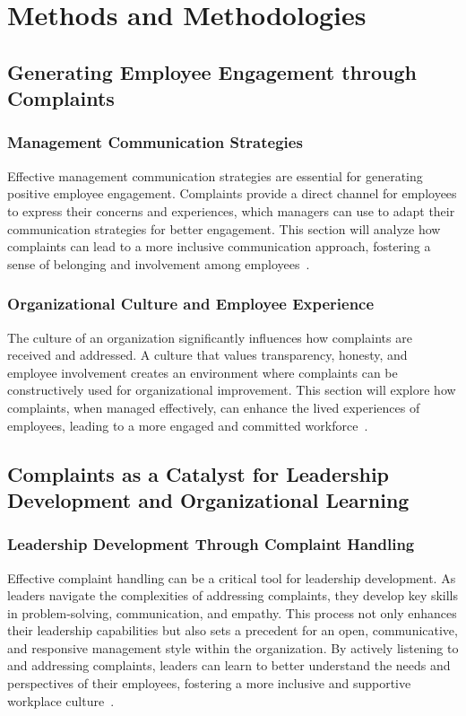 \documentclass[runningheads]{llncs}
\begin{document}
\newpage
\section{Methods and Methodologies}
\subsection{Generating Employee Engagement through Complaints}
\subsubsection{Management Communication Strategies}
Effective management communication strategies are essential for generating positive employee engagement. Complaints provide a direct channel for employees to express their concerns and experiences, which managers can use to adapt their communication strategies for better engagement. This section will analyze how complaints can lead to a more inclusive communication approach, fostering a sense of belonging and involvement among employees~\cite{reissner2013generating}.

\subsubsection{Organizational Culture and Employee Experience}
The culture of an organization significantly influences how complaints are received and addressed. A culture that values transparency, honesty, and employee involvement creates an environment where complaints can be constructively used for organizational improvement. This section will explore how complaints, when managed effectively, can enhance the lived experiences of employees, leading to a more engaged and committed workforce~\cite{reissner2013generating}.

\subsection{Complaints as a Catalyst for Leadership Development and Organizational Learning}
\subsubsection{Leadership Development Through Complaint Handling}
Effective complaint handling can be a critical tool for leadership development. As leaders navigate the complexities of addressing complaints, they develop key skills in problem-solving, communication, and empathy. This process not only enhances their leadership capabilities but also sets a precedent for an open, communicative, and responsive management style within the organization. By actively listening to and addressing complaints, leaders can learn to better understand the needs and perspectives of their employees, fostering a more inclusive and supportive workplace culture~\cite{bear2017performance}.
\end{document}

